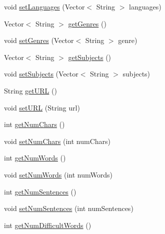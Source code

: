 \begin{DoxyCompactItemize}
\item 
void \mbox{\hyperlink{classbridges_1_1data__src__dependent_1_1_gutenberg_book_aa201ecea7ae505f66bd97ad7a18c7729}{set\+Languages}} (Vector$<$ String $>$ languages)
\item 
Vector$<$ String $>$ \mbox{\hyperlink{classbridges_1_1data__src__dependent_1_1_gutenberg_book_a7b703adfeef0bd494d1a17ac54b058ce}{get\+Genres}} ()
\item 
void \mbox{\hyperlink{classbridges_1_1data__src__dependent_1_1_gutenberg_book_a76bf1d07025029f0cc9443a6d3d5a956}{set\+Genres}} (Vector$<$ String $>$ genre)
\item 
Vector$<$ String $>$ \mbox{\hyperlink{classbridges_1_1data__src__dependent_1_1_gutenberg_book_a2cc3e828698852aec79279857e519478}{get\+Subjects}} ()
\item 
void \mbox{\hyperlink{classbridges_1_1data__src__dependent_1_1_gutenberg_book_a01c0c69770b1e58b8271f50a4bdf2966}{set\+Subjects}} (Vector$<$ String $>$ subjects)
\item 
String \mbox{\hyperlink{classbridges_1_1data__src__dependent_1_1_gutenberg_book_a7706b211a1acd2a1672d560907eea908}{get\+U\+RL}} ()
\item 
void \mbox{\hyperlink{classbridges_1_1data__src__dependent_1_1_gutenberg_book_a9069f9c6835df30ccabf179158b9aa18}{set\+U\+RL}} (String url)
\item 
int \mbox{\hyperlink{classbridges_1_1data__src__dependent_1_1_gutenberg_book_a232d5410eaef5ef75208d42a5125a363}{get\+Num\+Chars}} ()
\item 
void \mbox{\hyperlink{classbridges_1_1data__src__dependent_1_1_gutenberg_book_a3f5553b807a6a4f0f97d15b615344159}{set\+Num\+Chars}} (int num\+Chars)
\item 
int \mbox{\hyperlink{classbridges_1_1data__src__dependent_1_1_gutenberg_book_adf4daf7ef5446856d17749698bfec2a2}{get\+Num\+Words}} ()
\item 
void \mbox{\hyperlink{classbridges_1_1data__src__dependent_1_1_gutenberg_book_af84b3422dbb558aa08ff1b40c0068c87}{set\+Num\+Words}} (int num\+Words)
\item 
int \mbox{\hyperlink{classbridges_1_1data__src__dependent_1_1_gutenberg_book_a0d42fd351ee8b2861e43b6c4aad2bca1}{get\+Num\+Sentences}} ()
\item 
void \mbox{\hyperlink{classbridges_1_1data__src__dependent_1_1_gutenberg_book_a3690d6d74f3f47aa8a0fbc4d57f3102a}{set\+Num\+Sentences}} (int num\+Sentences)
\item 
int \mbox{\hyperlink{classbridges_1_1data__src__dependent_1_1_gutenberg_book_ad73c847c8f4c2ce0873b2f14ae6af704}{get\+Num\+Difficult\+Words}} ()

\end{DoxyCompactItemize}

